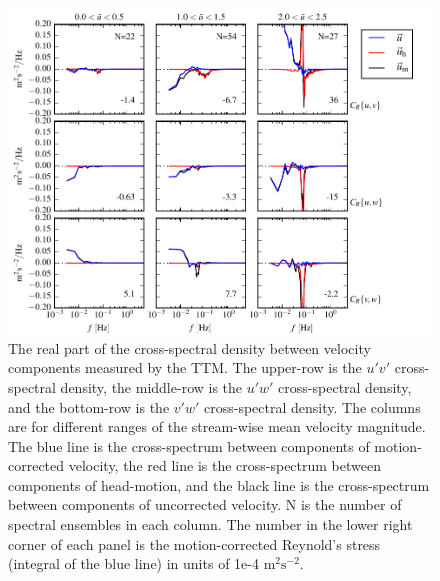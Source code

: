 \documentclass[twocol]{ametsoc}
\begin{document}
\begin{figure}[t]
  \centering
  \includegraphics{StressSpec_TTM_03}
  \caption{The real part of the cross-spectral density between velocity components measured by the TTM. The upper-row is the $u'v'$ cross-spectral density, the middle-row is the $u'w'$ cross-spectral density, and the bottom-row is the $v'w'$ cross-spectral density.  The columns are for different ranges of the stream-wise mean velocity magnitude. The blue line is the cross-spectrum between components of motion-corrected velocity, the red line is the cross-spectrum between components of head-motion, and the black line is the cross-spectrum between components of uncorrected velocity. N is the number of spectral ensembles in each column. The number in the lower right corner of each panel is the motion-corrected Reynold's stress (integral of the blue line) in units of 1e-4 $\mathrm{m^2s^{-2}}$.}
  \label{fig:stressspec:ttm}
\end{figure}
\end{document}
